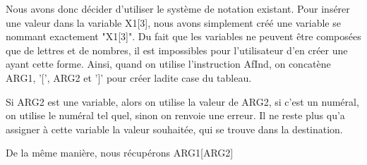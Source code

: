 \documentclass{article}
\begin{document}
Nous avons donc décider d'utiliser le système de notation existant. Pour insérer une valeur dans la variable X1[3], nous avons simplement créé une variable se nommant exactement "X1[3]".
Du fait que les variables ne peuvent être composées que de lettres et de nombres, il est impossibles pour l'utilisateur d'en créer une ayant cette forme.
Ainsi, quand on utilise l'instruction AfInd, on concatène ARG1, '[', ARG2 et ']' pour créer ladite case du tableau.

Si ARG2 est une variable, alors on utilise la valeur de ARG2, si c'est un numéral, on utilise le numéral tel quel, sinon on renvoie une erreur.
Il ne reste plus qu'a assigner à cette variable la valeur souhaitée, qui se trouve dans la destination.

De la même manière, nous récupérons ARG1[ARG2]
\end{document}
